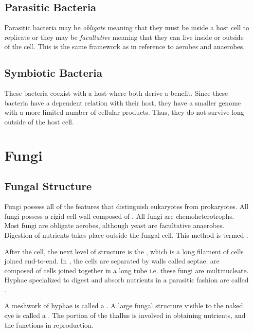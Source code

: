 \documentclass[../Bio_chemistryReview.tex]{subfiles}
\begin{document}
\subsection{Parasitic Bacteria}
Parasitic bacteria may be \textit{obligate} meaning that they must be inside a
host cell to replicate or they may be \textit{facultative} meaning that they can
live inside or outside of the cell. This is the same framework as in reference
to aerobes and anaerobes.

\subsection{Symbiotic Bacteria}
These bacteria coexist with a host where both derive a benefit. Since these
bacteria have a dependent relation with their host, they have a smaller genome
with a more limited number of cellular products. Thus, they do not survive long
outside of the host cell.

\section{Fungi}
\subsection{Fungal Structure}
Fungi possess all of the features that distinguish eukaryotes from prokaryotes.
All fungi possess a rigid cell wall composed of . All fungi are
chemoheterotrophs. Most fungi are obligate aerobes, although yeast are
facultative anaerobes. Digestion of nutrients takes place outside the fungal
cell. This method is termed .\par

After the cell, the next level of structure is the , which is a
long filament of cells joined end-to-end. In , the cells
are separated by walls called septae.  are composed of
cells joined together in a long tube i.e. these fungi are multinucleate. Hyphae
specialized to digest and absorb nutrients in a parasitic fashion are called
.\par

A meshwork of hyphae is called a . A large fungal structure
visible to the naked eye is called a . The
 portion of the thallus is involved in obtaining nutrients,
and the  functions in reproduction.
\end{document}
